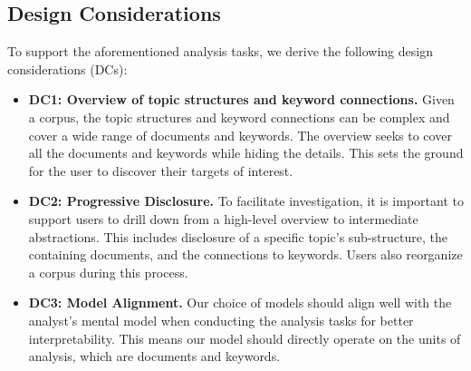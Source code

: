 \subsection{Design Considerations}
To support the aforementioned analysis tasks, we derive the following design considerations (DCs):
\begin{itemize}
  \item \textbf{DC1: Overview of topic structures and keyword connections.}
  Given a corpus, the topic structures and keyword connections can be complex and cover a wide range of documents and keywords. 
  The overview seeks to cover all the documents and keywords while hiding the details.
  This sets the ground for the user to discover their targets of interest.
  \item \textbf{DC2: Progressive Disclosure.}
  To facilitate investigation, it is important to support users to drill down from a high-level overview to intermediate abstractions.
  This includes disclosure of a specific topic's sub-structure, the containing documents, and the connections to keywords.
  Users also reorganize a corpus during this process.
  \item \textbf{DC3: Model Alignment.}
  Our choice of models should align well with the analyst's mental model when conducting the analysis tasks for better interpretability.
  This means our model should directly operate on the units of analysis, which are documents and keywords.
\end{itemize}


